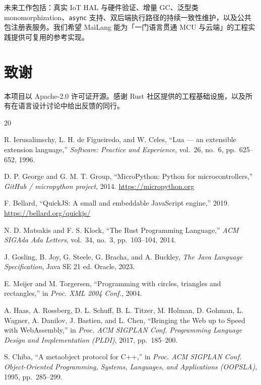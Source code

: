 \documentclass[10pt,a4paper]{article}
\begin{document}
未来工作包括：真实 IoT HAL 与硬件验证、增量 GC、泛型类 monomorphization、\texttt{async} 支持、双后端执行路径的持续一致性维护，以及公共包注册表服务。我们希望 MaìLang 能为「一门语言贯通 MCU 与云端」的工程实践提供可复用的参考实现。

\section*{致谢}

本项目以 Apache-2.0 许可证开源。感谢 Rust 社区提供的工程基础设施，以及所有在语言设计讨论中给出反馈的同行。

\begin{thebibliography}{20}

R. Ierusalimschy, L. H. de Figueiredo, and W. Celes,
``Lua --- an extensible extension language,''
\emph{Software: Practice and Experience}, vol.~26, no.~6, pp.~625--652, 1996.

D. P. George and G. M. T. Group,
``MicroPython: Python for microcontrollers,''
\emph{GitHub / micropython project}, 2014.
\url{https://micropython.org}

F. Bellard,
``QuickJS: A small and embeddable JavaScript engine,''
2019. \url{https://bellard.org/quickjs/}

N. D. Matsakis and F. S. Klock,
``The Rust Programming Language,''
\emph{ACM SIGAda Ada Letters}, vol.~34, no.~3, pp.~103--104, 2014.

J. Gosling, B. Joy, G. Steele, G. Bracha, and A. Buckley,
\emph{The Java Language Specification}, Java SE 21 ed.
Oracle, 2023.

E. Meijer and M. Torgersen,
``Programming with circles, triangles and rectangles,''
in \emph{Proc. XML 2004 Conf.}, 2004.

A. Haas, A. Rossberg, D. L. Schuff, B. L. Titzer, M. Holman,
D. Gohman, L. Wagner, A. Danilov, J. Bastien, and L. Chen,
``Bringing the Web up to Speed with WebAssembly,''
in \emph{Proc. ACM SIGPLAN Conf. Programming Language Design and Implementation (PLDI)}, 2017, pp.~185--200.

S. Chiba,
``A metaobject protocol for C++,''
in \emph{Proc. ACM SIGPLAN Conf. Object-Oriented Programming, Systems, Languages, and Applications (OOPSLA)}, 1995, pp.~285--299.


\end{thebibliography}
\end{document}
